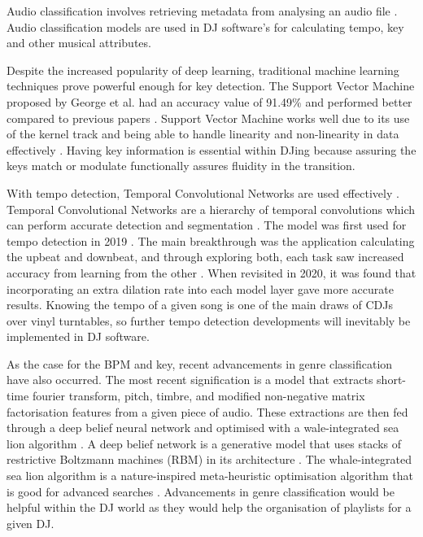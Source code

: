 Audio classification involves retrieving metadata from analysing an audio file \citep{sharma_audio_2021}. Audio classification models are used in DJ software's for calculating tempo, key and other musical attributes.

Despite the increased popularity of deep learning, traditional machine learning techniques prove powerful enough for key detection. The Support Vector Machine proposed by George et al. had an accuracy value of 91.49\% and performed better compared to previous papers \citep{george_development_2022}. Support Vector Machine works well due to its use of the kernel track and being able to handle linearity and non-linearity in data effectively \citep{hofmann_support_2006}. Having key information is essential within DJing because assuring the keys match or modulate functionally assures fluidity in the transition. 

With tempo detection, Temporal Convolutional Networks are used effectively \citep{bock_deconstruct_2020}. Temporal Convolutional Networks are a hierarchy of temporal convolutions which can perform accurate detection and segmentation \citep{lea_temporal_2017}. The model was first used for tempo detection in 2019 \citep{bock_multi-task_2019}. The main breakthrough was the application calculating the upbeat and downbeat, and through exploring both, each task saw increased accuracy from learning from the other \citep{bock_multi-task_2019}. When revisited in 2020, it was found that incorporating an extra dilation rate into each model layer gave more accurate results. Knowing the tempo of a given song is one of the main draws of CDJs over vinyl turntables, so further tempo detection developments will inevitably be implemented in DJ software.

As the case for the BPM and key, recent advancements in genre classification have also occurred. The most recent signification is a model that extracts short-time fourier transform, pitch, timbre, and modified non-negative matrix factorisation features from a given piece of audio. These extractions are then fed through a deep belief neural network and optimised with a wale-integrated sea lion algorithm \citep{kumaraswamy_optimal_2022}. A deep belief network is a generative model that uses stacks of restrictive Boltzmann machines (RBM) in its architecture \citep{canuma_what_2022}. The whale-integrated sea lion algorithm is a nature-inspired meta-heuristic optimisation algorithm that is good for advanced searches \citep{mirjalili_whale_2016}. Advancements in genre classification would be helpful within the DJ world as they would help the organisation of playlists for a given DJ.

